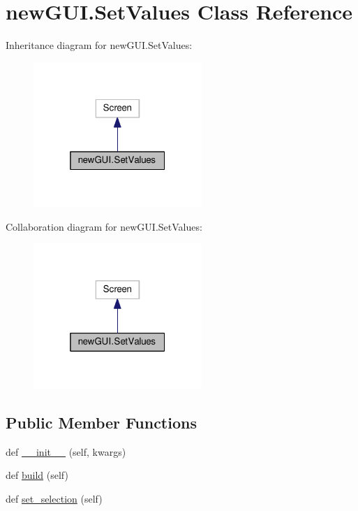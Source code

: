 \hypertarget{classnewGUI_1_1SetValues}{}\section{new\+G\+U\+I.\+Set\+Values Class Reference}
\label{classnewGUI_1_1SetValues}


Inheritance diagram for new\+G\+U\+I.\+Set\+Values\+:\nopagebreak
\begin{figure}[H]
\begin{center}
\leavevmode
\includegraphics[width=181pt]{classnewGUI_1_1SetValues__inherit__graph}
\end{center}
\end{figure}


Collaboration diagram for new\+G\+U\+I.\+Set\+Values\+:\nopagebreak
\begin{figure}[H]
\begin{center}
\leavevmode
\includegraphics[width=181pt]{classnewGUI_1_1SetValues__coll__graph}
\end{center}
\end{figure}
\subsection*{Public Member Functions}
\begin{DoxyCompactItemize}
\item 
def \hyperlink{classnewGUI_1_1SetValues_a87f51c45a17d725a633c91009545f48d}{\+\_\+\+\_\+init\+\_\+\+\_\+} (self, kwargs)
\item 
def \hyperlink{classnewGUI_1_1SetValues_a120cf308a18748a9f3bf0b53e37a1515}{build} (self)
\item 
def \hyperlink{classnewGUI_1_1SetValues_aa73b14246d4537dfe4fd78c7c68d1217}{set\+\_\+selection} (self)
\end{DoxyCompactItemize}
